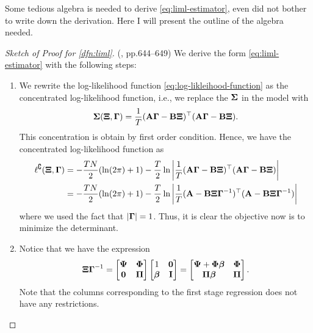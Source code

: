 \documentclass[a4paper]{article}
\begin{document}
\begin{remark}
	Some tedious algebra is needed to derive \eqref{eq:liml-estimator},
	even \textcite{hayashi-2001} did not bother to write down the derivation.
	Here I will present the outline of the algebra needed.
\end{remark}

\begin{proof}[Sketch of Proof for \autoref{dfn:liml}](\textcite{davidson-mackinnon-1993}, pp.644--649)
	We derive the form \eqref{eq:liml-estimator} with the following steps:
	\begin{enumerate}
		\item
			We rewrite the log-likelihood function \eqref{eq:log-likleihood-function} as
			the concentrated log-likelihood function, i.e., 
			we replace the $\boldsymbol{\Sigma}$ in the model with
			\begin{align*}
				\boldsymbol{\Sigma}(\boldsymbol{\Xi},\boldsymbol{\Gamma})
				= \frac1T(\mathbf{A}\boldsymbol{\Gamma}-\mathbf{B}\boldsymbol{\Xi})^\top(\mathbf{A}\boldsymbol{\Gamma}-\mathbf{B}\boldsymbol{\Xi}).
			\end{align*}
			This concentration is obtain by first order condition.
			Hence, we have the concentrated log-likelihood function as
			\begin{align*}
				\ell^{\complement}(\boldsymbol{\Xi},\boldsymbol{\Gamma})
				&= -\frac{TN}{2}(\ln(2\pi) + 1) - \frac{T}{2} \ln\left|\frac1T(\mathbf{A}\boldsymbol{\Gamma}-\mathbf{B}\boldsymbol{\Xi})^\top(\mathbf{A}\boldsymbol{\Gamma}-\mathbf{B}\boldsymbol{\Xi})\right| \\
				&= -\frac{TN}{2}(\ln(2\pi) + 1) - \frac{T}{2} \ln\left|\frac1T(\mathbf{A}-\mathbf{B}\boldsymbol{\Xi}\boldsymbol{\Gamma}^{-{1}})^\top(\mathbf{A}-\mathbf{B}\boldsymbol{\Xi}\boldsymbol{\Gamma}^{-{1}})\right|
			\end{align*}
			where we used the fact that $|\boldsymbol{\Gamma}|=1$.
			Thus, it is clear the objective now is to minimize the determinant.
		\item
			Notice that we have the expression
			\begin{align*}
				\boldsymbol{\Xi}\boldsymbol{\Gamma}^{-{1}}
				=
				\begin{bmatrix}
					\boldsymbol{\Psi} & \boldsymbol{\Phi} \\
					\mathbf{0} & \boldsymbol{\Pi}
				\end{bmatrix}
				\begin{bmatrix}
					1 & \mathbf{0} \\
					\boldsymbol{\beta} & \mathbf{I}
				\end{bmatrix}
				=
				\begin{bmatrix}
					\boldsymbol{\Psi} + \boldsymbol{\Phi}\boldsymbol{\beta} & \boldsymbol{\Phi} \\
					\boldsymbol{\Pi}\boldsymbol{\beta} & \boldsymbol{\Pi}
				\end{bmatrix}.
			\end{align*}
			Note that the columns corresponding to the first stage regression does not have any restrictions.

\end{enumerate}
\end{proof}
\end{document}
